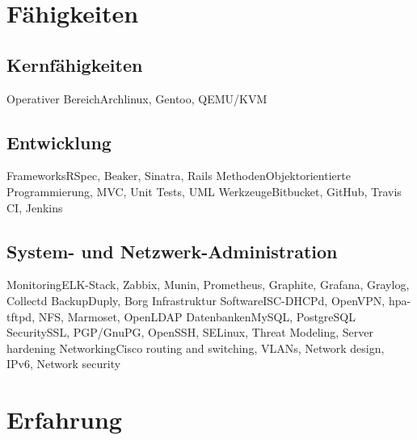 

\section{Fähigkeiten}

\subsection{Kernfähigkeiten}
           {Operativer Bereich}{Archlinux\contributor, Gentoo, QEMU/KVM}

\subsection{Entwicklung}
           {Frameworks}{RSpec, Beaker, Sinatra, Rails}
           {Methoden}{Objektorientierte Programmierung, MVC, Unit Tests, UML}
           {Werkzeuge}{Bitbucket, GitHub, Travis CI, Jenkins}

\subsection{System- und Netzwerk-Administration}
           {Monitoring}{ELK-Stack, Zabbix, Munin, Prometheus, Graphite, Grafana, Graylog, Collectd}
           {Backup}{Duply, Borg}
           {Infrastruktur Software}{ISC-DHCPd, OpenVPN, hpa-tftpd, NFS, Marmoset, OpenLDAP}
           {Datenbanken}{MySQL, PostgreSQL}
           {Security}{SSL, PGP/GnuPG, OpenSSH, SELinux, Threat Modeling, Server hardening}
           {Networking}{Cisco routing and switching, VLANs, Network design, IPv6, Network security}

\newpage

\section{Erfahrung}

